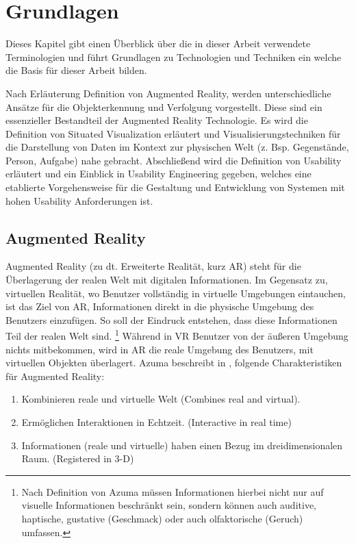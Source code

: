 \chapter{Grundlagen} \label{CapterFundamentals}

Dieses Kapitel gibt einen Überblick über die in dieser Arbeit verwendete Terminologien und führt Grundlagen zu Technologien und Techniken ein welche die Basis für dieser Arbeit bilden. 

Nach Erläuterung Definition von Augmented Reality, werden unterschiedliche Ansätze für die Objekterkennung und Verfolgung vorgestellt.  
Diese sind ein essenzieller Bestandteil der Augmented Reality Technologie. Es wird die Definition von Situated Visualization erläutert 
und Visualisierungstechniken für die Darstellung von Daten im Kontext zur physischen Welt (z. Bsp. Gegenstände, Person, Aufgabe) nahe gebracht. 
Abschließend wird die Definition von Usability erläutert und ein Einblick in Usability Engineering gegeben, welches eine etablierte Vorgehensweise für die 
Gestaltung und Entwicklung von Systemen mit hohen Usability Anforderungen ist. 

\section{Augmented Reality}

Augmented Reality (zu dt. Erweiterte Realität, kurz AR) steht für die Überlagerung der realen Welt mit digitalen Informationen. \cite{Azuma.1997,DieterSchmalstieg2016} Im Gegensatz zu, virtuellen Realität, wo Benutzer vollständig in virtuelle Umgebungen eintauchen,
ist das Ziel von AR, Informationen direkt in die physische Umgebung des Benutzers einzufügen. So soll der Eindruck entstehen, dass diese Informationen Teil der realen Welt sind. \footnote{Nach Definition von Azuma  müssen Informationen hierbei nicht nur auf visuelle Informationen beschränkt sein, 
sondern können auch auditive, haptische, gustative (Geschmack) oder auch olfaktorische (Geruch) umfassen.} \cite{Azuma.1997} Während in VR Benutzer von der äußeren Umgebung nichts mitbekommen, wird in AR die reale Umgebung des Benutzers, mit virtuellen 
Objekten überlagert. Azuma beschreibt in \cite{Azuma.1997}, folgende Charakteristiken für Augmented Reality: 

\begin{enumerate}
	\item Kombinieren reale und virtuelle Welt (Combines real and virtual).
	\item Ermöglichen Interaktionen in Echtzeit. (Interactive in real time)
	\item Informationen (reale und virtuelle) haben einen Bezug im dreidimensionalen Raum. (Registered in 3-D)
\end{enumerate}


